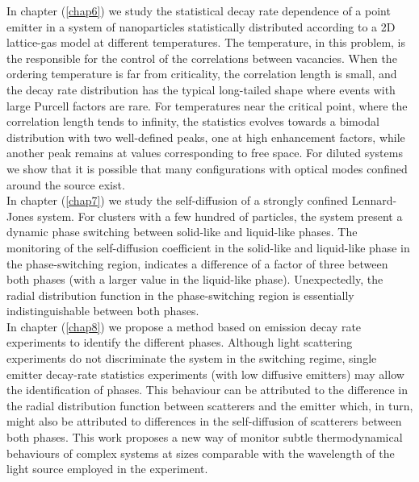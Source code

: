 In chapter (\ref{chap6}) we study the statistical decay rate dependence of a point emitter in a system of nanoparticles statistically distributed according to a 2D lattice-gas model at different temperatures. The temperature, in this problem, is the responsible for the control of the correlations between vacancies. When the ordering temperature is far from criticality, the correlation length is small, and the decay rate distribution has the typical long-tailed shape where events with large Purcell factors are rare.
For temperatures near the critical point, where the correlation length tends to infinity, the statistics evolves towards a bimodal distribution with two well-defined peaks, one at high enhancement factors, while another peak remains at values corresponding to free space. %
For diluted systems we show that it is possible that many configurations with optical modes confined around the source exist.\\
In chapter (\ref{chap7}) we study the self-diffusion of a strongly confined Lennard-Jones system. For clusters with a few hundred of particles, the system present a dynamic phase switching between solid-like and liquid-like phases. The monitoring of the self-diffusion coefficient in the solid-like and liquid-like phase in the phase-switching region, indicates a difference of a factor of three between both phases (with a larger value in the liquid-like phase). Unexpectedly, the radial distribution function in the phase-switching region is essentially indistinguishable between both phases.\\%
In chapter (\ref{chap8}) we propose a method based on emission decay rate experiments to identify the different phases. Although light scattering experiments do not discriminate the system in the switching regime, single emitter decay-rate statistics experiments (with low diffusive emitters) may allow the identification of phases. This behaviour can be attributed to the difference in the radial distribution function between scatterers and the emitter which, in turn, might also be attributed to differences in the self-diffusion of scatterers between both phases. This work proposes a new way of monitor subtle thermodynamical behaviours of complex systems at sizes comparable with the wavelength of the light source employed in the experiment.\\
